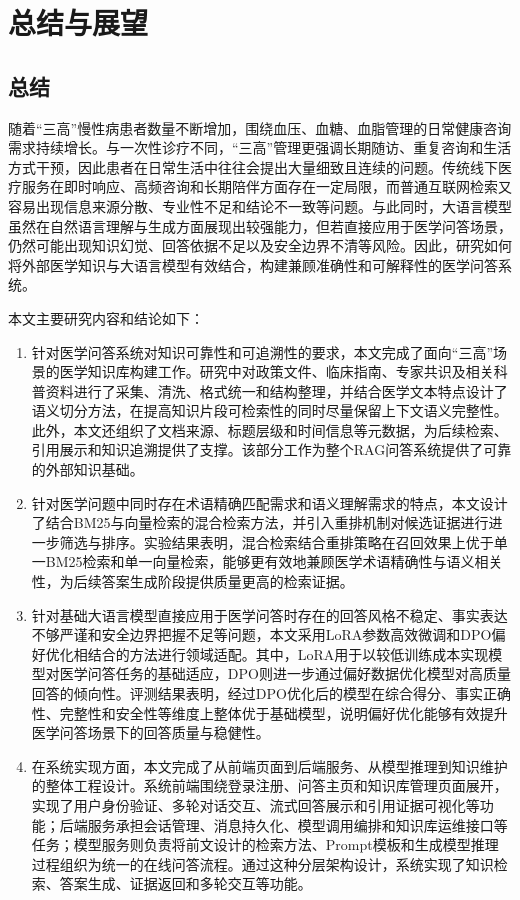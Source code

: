 
\chapter{总结与展望}\label{ch:6}
\section{总结}

随着“三高”慢性病患者数量不断增加，围绕血压、血糖、血脂管理的日常健康咨询需求持续增长。与一次性诊疗不同，“三高”管理更强调长期随访、重复咨询和生活方式干预，因此患者在日常生活中往往会提出大量细致且连续的问题。传统线下医疗服务在即时响应、高频咨询和长期陪伴方面存在一定局限，而普通互联网检索又容易出现信息来源分散、专业性不足和结论不一致等问题。与此同时，大语言模型虽然在自然语言理解与生成方面展现出较强能力，但若直接应用于医学问答场景，仍然可能出现知识幻觉、回答依据不足以及安全边界不清等风险。因此，研究如何将外部医学知识与大语言模型有效结合，构建兼顾准确性和可解释性的医学问答系统。

本文主要研究内容和结论如下：
\begin{enumerate}[label=(\arabic*)]
    \item 针对医学问答系统对知识可靠性和可追溯性的要求，本文完成了面向“三高”场景的医学知识库构建工作。研究中对政策文件、临床指南、专家共识及相关科普资料进行了采集、清洗、格式统一和结构整理，并结合医学文本特点设计了语义切分方法，在提高知识片段可检索性的同时尽量保留上下文语义完整性。此外，本文还组织了文档来源、标题层级和时间信息等元数据，为后续检索、引用展示和知识追溯提供了支撑。该部分工作为整个RAG问答系统提供了可靠的外部知识基础。
    \item 针对医学问题中同时存在术语精确匹配需求和语义理解需求的特点，本文设计了结合BM25与向量检索的混合检索方法，并引入重排机制对候选证据进行进一步筛选与排序。实验结果表明，混合检索结合重排策略在召回效果上优于单一BM25检索和单一向量检索，能够更有效地兼顾医学术语精确性与语义相关性，为后续答案生成阶段提供质量更高的检索证据。
    \item 针对基础大语言模型直接应用于医学问答时存在的回答风格不稳定、事实表达不够严谨和安全边界把握不足等问题，本文采用LoRA参数高效微调和DPO偏好优化相结合的方法进行领域适配。其中，LoRA用于以较低训练成本实现模型对医学问答任务的基础适应，DPO则进一步通过偏好数据优化模型对高质量回答的倾向性。评测结果表明，经过DPO优化后的模型在综合得分、事实正确性、完整性和安全性等维度上整体优于基础模型，说明偏好优化能够有效提升医学问答场景下的回答质量与稳健性。
    \item 在系统实现方面，本文完成了从前端页面到后端服务、从模型推理到知识维护的整体工程设计。系统前端围绕登录注册、问答主页和知识库管理页面展开，实现了用户身份验证、多轮对话交互、流式回答展示和引用证据可视化等功能；后端服务承担会话管理、消息持久化、模型调用编排和知识库运维接口等任务；模型服务则负责将前文设计的检索方法、Prompt模板和生成模型推理过程组织为统一的在线问答流程。通过这种分层架构设计，系统实现了知识检索、答案生成、证据返回和多轮交互等功能。
\end{enumerate}

